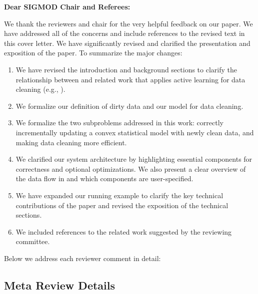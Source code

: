 {\noindent \normalsize \bf Dear SIGMOD Chair and Referees: }

\vspace{.5em}

We thank the reviewers and chair for the very helpful feedback on our paper. We have addressed all of the concerns and include references to the revised text in this cover letter. 
We have significantly revised and clarified the presentation and exposition
of the paper.
To summarize the major changes:
\begin{enumerate}
\item We have revised the introduction and background sections to clarify the relationship between \sys and related work that applies active learning for data cleaning (e.g., \cite{gokhale2014corleone, DBLP:journals/pvldb/YakoutENOI11, yakout2013don}).

\item We formalize our definition of dirty data and our model for data cleaning.

\item We formalize the two subproblems addressed in this work: correctly incrementally updating a convex statistical model with newly clean data, and making data cleaning more efficient.

\item We clarified our system architecture by highlighting essential components for correctness and optional optimizations. We also present a clear overview of the data flow in \sys and which components are user-specified.

\item We have expanded our running example to clarify the key technical contributions of the paper and revised the exposition of the technical sections.

\item We included references to the related work suggested by the reviewing committee.
\end{enumerate}
Below we address each reviewer comment in detail:

\vspace{0.5em}

\subsection*{Meta Review Details} 

